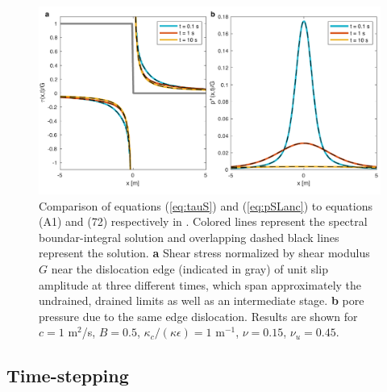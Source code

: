 \documentclass[draft]{agujournal2019}
\begin{document}
\begin{figure}[H]
\includegraphics[scale = 0.8]{Figures/Pore_pressure_benchmark_SandR2017.pdf} %
\caption{Comparison of equations (\ref{eq:tauS}) and (\ref{eq:pSLanc}) to equations (A1) and (72) respectively in . Colored lines represent the spectral boundar-integral solution and overlapping dashed black lines represent the  solution. \textbf{a} Shear stress normalized by shear modulus $G$ near the dislocation edge (indicated in gray) of unit slip amplitude at three different times, which span approximately the undrained, drained limits as well as an intermediate stage. \textbf{b} pore pressure due to the same edge dislocation. Results are shown for $c = 1$ m$^2$/s, $B = 0.5$, $\kappa_c/(\kappa \epsilon) = 1 $ m$^{-1}$, $\nu=0.15$, $\nu_u = 0.45$.}
\label{fig:Song}
\end{figure}

\subsection{Time-stepping} \label{sec:time}
\end{document}
